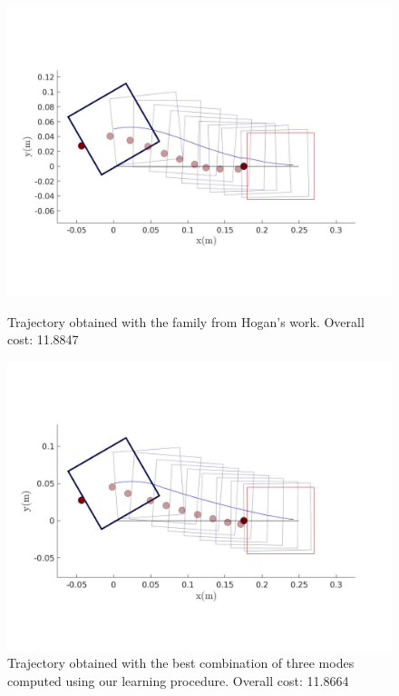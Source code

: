 \documentclass[12,twoside]{TFG-GM}
\theoremstyle{definition}
\theoremstyle{remark}
\begin{document}
\begin{figure}
    \centering
    \begin{minipage}{0.45\textwidth}
        \centering
        \includegraphics[width=1\textwidth]{learning_straight_original.jpg} %
        \caption{Trajectory obtained with the family from Hogan's work. Overall cost: 11.8847}
    \end{minipage}\hfill
    \begin{minipage}{0.5\textwidth}
        \centering
        \includegraphics[width=1\textwidth]{learning_straight_3_modes.jpg} %
        \caption{Trajectory obtained with the best combination of three modes computed using our learning procedure. Overall cost: 11.8664}
    \end{minipage}
\end{figure}
\end{document}
